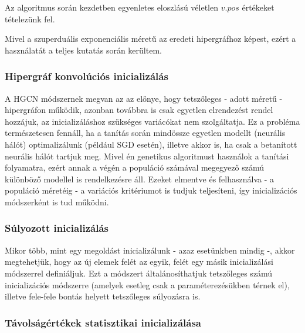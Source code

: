 Az algoritmus során kezdetben egyenletes eloszlású véletlen $v.pos$ értékeket tételezünk fel.


\begin{note}
Mivel a szuperduális exponenciális méretű az eredeti hipergráfhoz képest, ezért a használatát a teljes kutatás során kerültem.
\end{note}

\subsubsection{Hipergráf konvolúciós inicializálás}

A HGCN módszernek megvan az az előnye, hogy tetszőleges - adott méretű - hipergráfon működik, azonban továbbra is csak egyetlen elrendezést rendel hozzájuk, az inicializáláshoz szükséges variácókat nem szolgáltatja. Ez a probléma természetesen fennáll, ha a tanítás során mindössze egyetlen modellt (neurális hálót) optimalizálunk (például SGD esetén), illetve akkor is, ha csak a betanított neurális hálót tartjuk meg. Mivel én genetikus algoritmust használok a tanítási folyamatra, ezért annak a végén a populáció számával megegyező számú különböző modellel is rendelkezésre áll. Ezeket elmentve és felhasználva - a populáció méretéig - a variációs kritériumot is tudjuk teljesíteni, így inicializációs módszerként is tud működni.

\subsubsection{Súlyozott inicializálás}

Mikor több, mint egy megoldást inicializálunk - azaz esetünkben mindig -, akkor megtehetjük, hogy az új elemek felét az egyik, felét egy másik inicializálási módszerrel definiáljuk. Ezt a módszert általánosíthatjuk tetszőleges számú inicializációs módszerre (amelyek esetleg csak a paraméterezésükben térnek el), illetve fele-fele bontás helyett tetszőleges súlyozásra is.


\subsubsection{Távolságértékek statisztikai inicializálása}

